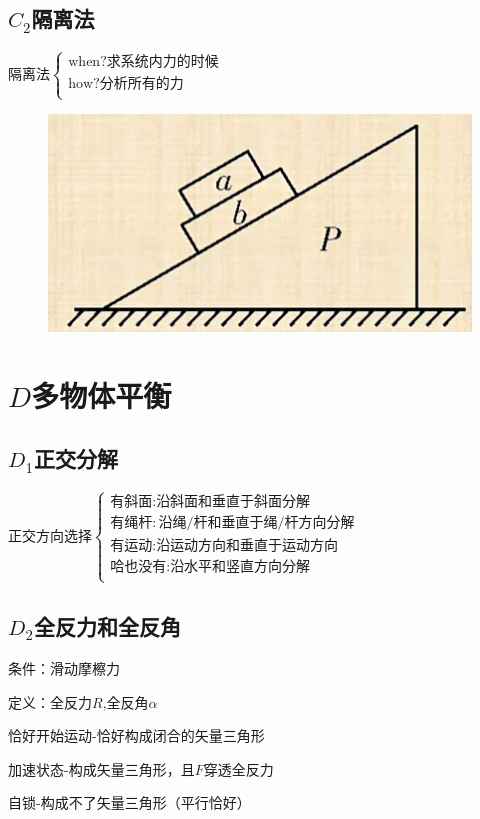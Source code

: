 \documentclass[lang=cn,10pt]{elegantbook}
\begin{document}
	\subsection{$C_{2}$隔离法}
	$\text{隔离法}\begin{cases}
		\mathrm{when}? \text{求系统内力的时候}\\
		\mathrm{how}? \text{分析所有的力}\\
	\end{cases}$
	
	\begin{example}
		\begin{figure}[H]
			\centering
			\includegraphics[width=0.3\linewidth]{image/29}
		\end{figure}
	\end{example}
	\vspace{3cm}
	\section{$D$多物体平衡}
	\subsection{$D_{1}$正交分解}
	$\text{正交方向选择}\left\{ \begin{array}{c}
		\text{有斜面}:\text{沿斜面和垂直于斜面分解}\\
		\text{有绳杆}:\text{沿绳}/\text{杆和垂直于绳}/\text{杆方向分解}\\
		\text{有运动}:\text{沿运动方向和垂直于运动方向}\\
		\text{哈也没有}:\text{沿水平和竖直方向分解}\\
	\end{array} \right. $
	\subsection{$D_{2}$全反力和全反角}
	
	条件：滑动摩檫力
	
	定义：全反力$R$,全反角$\alpha$
	\begin{conclusion}
		恰好开始运动-恰好构成闭合的矢量三角形 
		
		加速状态-构成矢量三角形，且$F$穿透全反力
		
		自锁-构成不了矢量三角形（平行恰好）
	\end{conclusion}
	\vspace{6cm}
\end{document}
